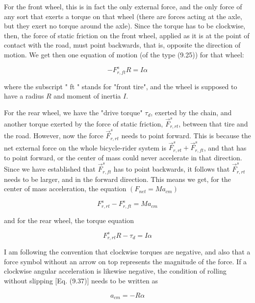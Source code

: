 \documentclass[10pt]{article}
\begin{document}
For the front wheel, this is in fact the only external force, and the only force of any sort that exerts a torque on that wheel (there are forces acting at the axle, but they exert no torque around the axle). Since the torque has to be clockwise, then, the force of static friction on the front wheel, applied as it is at the point of contact with the road, must point backwards, that is, opposite the direction of motion. We get then one equation of motion (of the type (9.25)) for that wheel:


\begin{equation*}
-F_{r, f t}^{s} R=I \alpha \tag{9.44}
\end{equation*}


where the subscript " ft " stands for "front tire", and the wheel is supposed to have a radius $R$ and moment of inertia $I$.

For the rear wheel, we have the "drive torque" $\tau_{d}$, exerted by the chain, and another torque exerted by the force of static friction, $\vec{F}_{r, r t}^{s}$, between that tire and the road. However, now the force $\vec{F}_{r, r t}^{s}$ needs to point forward. This is because the net external force on the whole bicycle-rider system is $\vec{F}_{r, r t}^{s}+\vec{F}_{r, f t}^{s}$, and that has to point forward, or the center of mass could never accelerate in that direction. Since we have established that $\vec{F}_{r, f t}^{s}$ has to point backwards, it follows that $\vec{F}_{r, r t}^{s}$ needs to be larger, and in the forward direction. This means we get, for the center of mass acceleration, the equation $\left(F_{n e t}=M a_{c m}\right)$


\begin{equation*}
F_{r, r t}^{s}-F_{r, f t}^{s}=M a_{c m} \tag{9.45}
\end{equation*}


and for the rear wheel, the torque equation


\begin{equation*}
F_{r, r t}^{s} R-\tau_{d}=I \alpha \tag{9.46}
\end{equation*}


I am following the convention that clockwise torques are negative, and also that a force symbol without an arrow on top represents the magnitude of the force. If a clockwise angular acceleration is likewise negative, the condition of rolling without slipping [Eq. (9.37)] needs to be written as


\begin{equation*}
a_{c m}=-R \alpha \tag{9.47}
\end{equation*}
\end{document}
